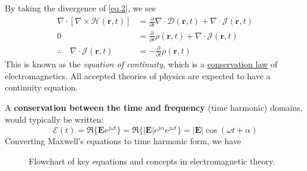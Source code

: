 By taking the divergence of \eqref{eq.2}, we see
\begin{align}
    \nabla \cdot [\nabla \times \bm{\mathcal{H}} (\mathbf{r}, t)] &= \frac{\partial}{\partial t} \nabla \cdot \bm{\mathcal{D}} (\mathbf{r}, t) + \nabla \cdot \bm{\mathcal{J}} (\mathbf{r}, t) \nonumber \\
    0 &= \frac{\partial}{\partial t} \rho (\mathbf{r}, t) + \nabla \cdot \bm{\mathcal{J}} (\mathbf{r}, t) \nonumber \\
    \therefore \quad \nabla \cdot \bm{\mathcal{J}} (\mathbf{r}, t) &= -\frac{\partial}{\partial t} \rho (\mathbf{r}, t) \label{eq.5}
\end{align}
This is known as the \textit{equation of continuity}, which is a \underline{conservation law} of electromagnetics. All accepted theories
of physics are expected to have a continuity equation. 

A \textbf{conservation between the time and frequency} (time harmonic) domains, would typically be written:
\[
    \bm{\mathcal{E}}(t) = \Re\{ \mathbf{E} e^{j\omega t} \} = \Re \{ |\mathbf{E}| e^{j\alpha} e^{j\omega t}\} = |\mathbf{E}| \cos (\omega t + \alpha)
\]
Converting Maxwell's equations to time harmonic form, we have



\pagebreak

\begin{figure}
    \centering
    \scalebox{0.8}{}
    \caption{Flowchart of key equations and concepts in electromagnetic theory.}
\end{figure}
